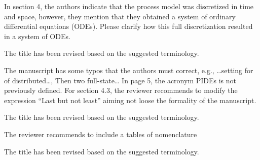 \documentclass[10pt,answers]{exam}
\begin{document}
\begin{questions}
    \question In section 4, the authors indicate that the process model was discretized in time and space, however, they mention that they obtained a system of ordinary differential equations (ODEs). Please clarify how this full discretization resulted in a system of ODEs.

    \begin{solutionorbox}
        The title has been revised based on the suggested terminology.
    \end{solutionorbox}


    \question The manuscript has some typos that the authors must correct, e.g., …setting for of distributed…, Then two full-state… In page 5, the acronym PIDEs is not previously defined. For section 4.3, the reviewer recommends to modify the expression “Last but not least” aiming not loose the formality of the manuscript.

    \begin{solutionorbox}
        The title has been revised based on the suggested terminology.
    \end{solutionorbox}


    \question The reviewer recommends to include a tables of nomenclature

    \begin{solutionorbox}
        The title has been revised based on the suggested terminology.
    \end{solutionorbox}
\end{questions}


\end{document}

